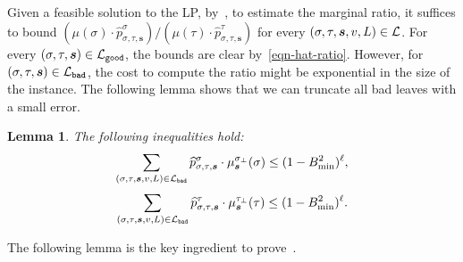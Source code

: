 \documentclass[11pt]{article}
\newtheorem{lemma}[theorem]{Lemma}
\def\!#1{\mathtt{#1}}
\newcommand{\wh}[1]{\widehat{#1}}
\newcommand{\seqS}{\boldsymbol{s}}
\newcommand{\qgl}[1]{{\color{purple}{#1}}}
\begin{document}


\qgl{check from here}
Given a feasible solution to the LP, by~, to estimate the marginal ratio, it suffices to bound $\left(\mu(\sigma)\cdot \wh{p}_{\sigma, \tau, \seqS}^{\sigma}\right)/\left(\mu(\tau)\cdot\wh{p}_{\sigma, \tau, \seqS}^{\tau}\right)$ for every $(\sigma, \tau, \seqS,v,L) \in \+L$. For every $(\sigma, \tau, \seqS) \in \+L_{\!{good}}$, the bounds are clear by~\eqref{eqn-hat-ratio}. However, for $(\sigma, \tau, \seqS) \in \+L_{\!{bad}}$, the cost to compute the ratio might be exponential in the size of the instance. The following lemma shows that we can truncate all bad leaves with a small error.

\begin{lemma} \label{lem:LP-truncated-error}
    The following inequalities hold:
    \begin{align}\label{eqn-error1}
        \sum_{(\sigma,\tau, \seqS,v,L)\in \+L_{\!{bad}}} \widehat{p}_{\sigma,\tau, \seqS}^{\sigma}\cdot \mu^{\sigma_{\bot}}_{\seqS}(\sigma)\leq (1 - B_{\min}^2)^{\ell},
    \end{align}
    \begin{align}\label{eqn-error2}
        \sum_{(\sigma,\tau, \seqS,v,L)\in \+L_{\!{bad}}}\widehat{p}_{\sigma,\tau, \seqS}^{\tau}\cdot \mu^{\tau_{\bot}}_{\seqS}(\tau)\leq (1- B_{\min}^2)^{\ell}.
    \end{align}
\end{lemma}

The following lemma is the key ingredient to prove~.
\end{document}
